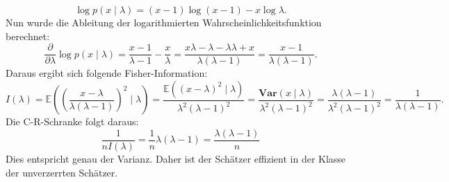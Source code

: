 \documentclass[10pt]{article}
\newcommand{\EW}{\mathbb{E}} %
\newcommand{\Var}{\textbf{Var}} %
\newenvironment{BSP}[1][]
{\begin{Beispiel}[frametitle=#1]}{\end{Beispiel}}
\begin{document}
\begin{BSP}[Beispiel 1.4.3 (Anwendung C-R-Schrank Geometrische Verteilung)]
		\begin{equation*}
			\log p (x \mid \lambda) = (x-1)\log (x-1) - x \log \lambda.
		\end{equation*}
		Nun wurde die Ableitung der logarithmierten Wahrscheinlichkeitsfunktion berechnet:
		\begin{equation*}
			\frac{\partial}{\partial\lambda} \log p(x \mid \lambda) = \frac{x-1}{\lambda -1} - \frac{x}{\lambda} = \frac{x \lambda - \lambda - \lambda \lambda + x}{\lambda (\lambda -1)} = \frac{x -1}{\lambda (\lambda -1)}.
		\end{equation*}
		Daraus ergibt sich folgende Fisher-Information:
		\begin{equation*}
			I(\lambda) = \EW\left(\left(\frac{x - \lambda}{\lambda ( \lambda -1)}\right)^2 \mid \lambda \right) = \frac{\EW ((x - \lambda)^2 \mid \lambda)}{\lambda^2(\lambda-1)^2} = \frac{\Var(x \mid \lambda)}{\lambda^2 (\lambda -1)^2} = \frac{\lambda (\lambda -1)}{\lambda^2 (\lambda -1)^2} = \frac{1}{\lambda (\lambda -1)}.
		\end{equation*}
		Die C-R-Schranke folgt daraus:
		\begin{equation*}
			\frac{1}{nI(\lambda)} = \frac{1}{n} \lambda ( \lambda - 1 ) = \frac{\lambda (\lambda -1)}{n}
		\end{equation*}
		Dies entspricht genau der Varianz. Daher ist der Schätzer effizient in der Klasse der unverzerrten Schätzer. 
	\end{BSP}

	
\end{document}
